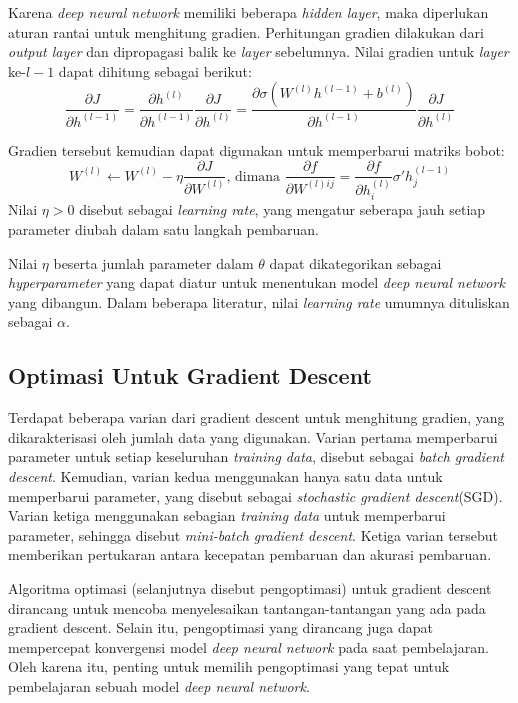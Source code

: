 Karena \emph{deep neural network} memiliki beberapa \emph{hidden layer}, maka diperlukan aturan rantai untuk menghitung gradien. Perhitungan gradien dilakukan dari \emph{output layer} dan dipropagasi balik ke \emph{layer} sebelumnya. Nilai gradien untuk \emph{layer} ke-$l-1$ dapat dihitung sebagai berikut:
\begin{equation}
  \frac{\partial J}{\partial h^{(l-1)}}
  = \frac{\partial h^{(l)}}{\partial h^{(l-1)}}
  \frac{\partial J}{\partial h^{(l)}}
  = \frac{\partial \sigma(W^{(l)} h^{(l-1)} + b^{(l)})}{\partial h^{(l-1)}}
  \frac{\partial J}{\partial h^{(l)}}
\end{equation}

Gradien tersebut kemudian dapat digunakan untuk memperbarui matriks bobot:
\begin{equation}
  W^{(l)} \leftarrow W^{(l)}
  - \eta \frac{\partial J}{\partial W^{(l)}}
  \text{, dimana }
  \frac{\partial f}{\partial W^{(l)ij}}
  = \frac{\partial f}{\partial h_i^{(l)}}\sigma'h_j^{(l-1)}
\end{equation}
Nilai $\eta > 0$ disebut sebagai \emph{learning rate}, yang mengatur seberapa jauh setiap parameter diubah dalam satu langkah pembaruan.

Nilai $\eta$ beserta jumlah parameter dalam $\theta$ dapat dikategorikan sebagai \emph{hyperparameter} yang dapat diatur untuk menentukan model \emph{deep neural network} yang dibangun. Dalam beberapa literatur, nilai \emph{learning rate} umumnya dituliskan sebagai $\alpha$.

\subsection{Optimasi Untuk Gradient Descent}
Terdapat beberapa varian dari gradient descent untuk menghitung gradien, yang dikarakterisasi oleh jumlah data yang digunakan. Varian pertama memperbarui parameter untuk setiap keseluruhan \emph{training data}, disebut sebagai \emph{batch gradient descent}. Kemudian, varian kedua menggunakan hanya satu data untuk memperbarui parameter, yang disebut sebagai \emph{stochastic gradient descent}(SGD). Varian ketiga menggunakan sebagian \emph{training data} untuk memperbarui parameter, sehingga disebut \emph{mini-batch gradient descent}. Ketiga varian tersebut memberikan pertukaran antara kecepatan pembaruan dan akurasi pembaruan.

Algoritma optimasi (selanjutnya disebut pengoptimasi) untuk gradient descent dirancang untuk mencoba menyelesaikan tantangan-tantangan yang ada pada gradient descent. Selain itu, pengoptimasi yang dirancang juga dapat mempercepat konvergensi model \emph{deep neural network} pada saat pembelajaran. Oleh karena itu, penting untuk memilih pengoptimasi yang tepat untuk pembelajaran sebuah model \emph{deep neural network}.

